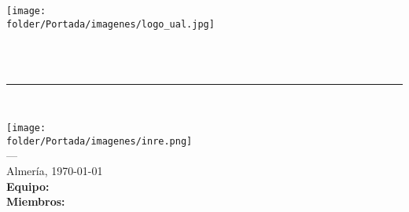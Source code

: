 \begin{titlepage}
 


\noindent\hspace*{\centeroffset}\begin{minipage}{\textwidth}

\centering
\texttt{[image: \\folder/Portada/imagenes/logo\_ual.jpg]}\\[0.8cm]

\textsc{ \Huge \miProyecto \\[0.7cm]}

{\Huge\bfseries \tipoDoc \\ }
\noindent\rule[-1ex]{\textwidth}{3pt}\\[3ex]

\end{minipage}

\vspace{2.3cm}
\noindent\hspace*{\centeroffset}\begin{minipage}{\textwidth}
\centering

\texttt{[image: \\folder/Portada/imagenes/inre.png]}\\[0.1cm]

\textsc{---}\\
Almería, \today \\[1cm]

\textbf{Equipo:} {\equipo}\\[0.2cm]
\textbf{Miembros:}\\ {\primerAl\\ \segunAl \\ \tercerAl}\\[1cm]


\end{minipage}

\end{titlepage}


